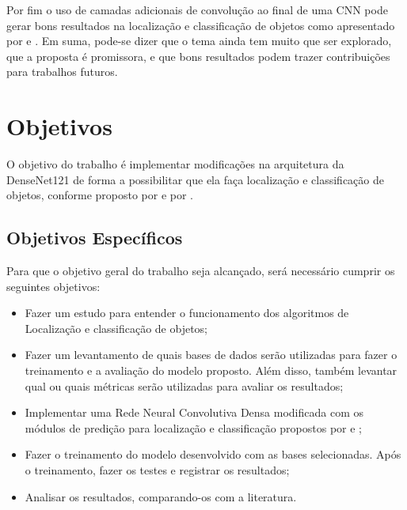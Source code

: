 Por fim o uso de camadas adicionais de convolução ao final de uma \ac{CNN} pode gerar bons resultados na localização e classificação de objetos como apresentado por  e . Em suma, pode-se dizer que o tema ainda tem muito que ser explorado, que a proposta é promissora, e que bons resultados podem trazer contribuições para trabalhos futuros.


\section{Objetivos}
\label{secao:1:2}  

O objetivo do trabalho é implementar modificações na arquitetura da \ac{DenseNet}121 de forma a possibilitar que ela faça localização e classificação de objetos, conforme proposto por  e por .

\subsection{Objetivos Específicos}

Para que o objetivo geral do trabalho seja alcançado, será necessário cumprir os seguintes objetivos:

\begin{itemize}
	\item Fazer um estudo para entender o funcionamento dos algoritmos de Localização e classificação de objetos;
	\item Fazer um levantamento de quais bases de dados serão utilizadas para fazer o treinamento e a avaliação do modelo proposto. Além disso, também levantar qual ou quais métricas serão utilizadas para avaliar os resultados;
	\item Implementar uma Rede Neural Convolutiva Densa modificada com os módulos de predição para localização e classificação propostos por  e ;
	\item Fazer o treinamento do modelo desenvolvido com as bases selecionadas. Após o treinamento, fazer os testes e registrar os resultados;
	\item Analisar os resultados, comparando-os com a literatura.
\end{itemize}

